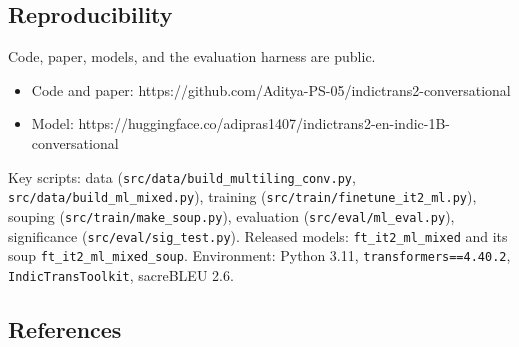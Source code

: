 \documentclass[
  11pt,
]{article}
\providecommand{\tightlist}{%
  \setlength{\itemsep}{0pt}\setlength{\parskip}{0pt}}
\begin{document}
\hypertarget{reproducibility}{%
\subsection{Reproducibility}\label{reproducibility}}

Code, paper, models, and the evaluation harness are public.

\begin{itemize}
\tightlist
\item
  Code and paper:
  https://github.com/Aditya-PS-05/indictrans2-conversational
\item
  Model:
  https://huggingface.co/adipras1407/indictrans2-en-indic-1B-conversational
\end{itemize}

Key scripts: data (\texttt{src/data/build\_multiling\_conv.py},
\texttt{src/data/build\_ml\_mixed.py}), training
(\texttt{src/train/finetune\_it2\_ml.py}), souping
(\texttt{src/train/make\_soup.py}), evaluation
(\texttt{src/eval/ml\_eval.py}), significance
(\texttt{src/eval/sig\_test.py}). Released models:
\texttt{ft\_it2\_ml\_mixed} and its soup
\texttt{ft\_it2\_ml\_mixed\_soup}. Environment: Python 3.11,
\texttt{transformers==4.40.2}, \texttt{IndicTransToolkit}, sacreBLEU
2.6.

\hypertarget{references}{%
\subsection{References}\label{references}}
\end{document}
